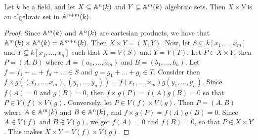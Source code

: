 \begin{lemma}\label{1.2.4}
    Let $k$ be a field, and let  $X \subseteq \mathbb{A}^n(k)$ and $Y \subseteq \mathbb{A}^m(k)$
    algebraic sets. Then $X \times Y$ is an algebraic set in  $\mathbb{A}^{n+m}(k)$.
\end{lemma}
\begin{proof}
    Since $\mathbb{A}^m(k)$ and $\mathbb{A}^n(k)$ are cartesian products, we have that $\mathbb{A}^m(k)
    \times \mathbb{A}^n(k)=\mathbb{A}^{m+n}(k)$. Then $X \times Y=(X,Y)$. Now, let $S \subseteq
    k[x_1, \dots, x_m]$ and $T \subseteq k[x_1, \dots,x_n]$ such that $X=V(S)$
    and $Y=V(T)$. Let $P \in X \times Y$, then  $P=(A,B)$ where $A=(a_1, \dots,
    a_m)$ and $B=(b_1, \dots, b_n)$.  Let $f=f_1+\dots+f_d+\dots \in S$ and
    $g=g_1+\dots+g_l \in T$. Consider then $f \times
    g((x_1, \dots, x_m),(y_1, \dots, y_n))=f(x_1, \dots, x_m)g(y_1, \dots,
    y_n)$. Since $f(A)=0$ and $g(B)=0$, then $f \times g(P)=f(A)g(B)=0$ so that
    $P \in V(f) \times V(g)$. Conversely, let $P \in V(f) \times V(g)$. Then
    $P=(A,B)$ where $A \in \mathbb{A}^m(k)$ and $B \in \mathbb{A}^n(k)$, and $f \times
    g(P)=f(A)g(B)=0$. Since  $A \in V(f)$ and $B \in V(g)$, we get $f(A)=0$ and
    $f(B)=0$, so that $P \in X \times Y$. This makes  $X \times Y=V(f) \times
    V(g)$.
\end{proof}
